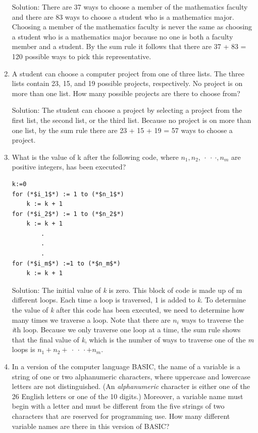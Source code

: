 \documentclass[11pt,a4paper]{book}
\begin{document}
\begin{enumerate}[label=Example~\arabic*]
Solution: There are 37 ways to choose a member of the mathematics faculty and there are 83 ways to choose a student who is a mathematics major.
Choosing a member of the mathematics faculty is never the same as choosing a student who is a mathematics major because no one is both a faculty member and a student.
By the sum rule it follows that there are 37 + 83 = 120 possible ways to pick this representative.

\item A student can choose a computer project from one of three lists.
The three lists contain 23, 15, and 19 possible projects, respectively.
No project is on more than one list. How many possible projects are there to choose from?

Solution: The student can choose a project by selecting a project from the first list, the second list, or the third list.
Because no project is on more than one list, by the sum rule there are 23 + 15 + 19 = 57 ways to choose a project.

\item What is the value of k after the following code, where $n_1, n_2, ~\cdot~\cdot~\cdot , n_m$ are positive integers, has been executed?

\begin{lstlisting}[style=CStyle]
k:=0
for (*$i_1$*) := 1 to (*$n_1$*)
	k := k + 1
for (*$i_2$*) := 1 to (*$n_2$*)
	k := k + 1
		.
		.
		.
for (*$i_m$*) :=1 to (*$n_m$*)
	k := k + 1
\end{lstlisting}

Solution: The initial value of \textit{k} is zero.
This block of code is made up of m different loops.
Each time a loop is traversed, 1 is added to \textit{k}.
To determine the value of \textit{k} after this code has been executed, we need to determine how many times we traverse a loop.
Note that there are $n_i$ ways to traverse the \textit{i}th loop.
Because we only traverse one loop at a time, the sum rule shows that the final value of \textit{k}, which is the number of ways to traverse one of the \textit{m} loops is $n_1 + n_2 +~\cdot~\cdot~\cdot+n_m$.

\item In a version of the computer language BASIC, the name of a variable is a string of one or two alphanumeric characters, where uppercase and lowercase letters are not distinguished.
(An \textit{alphanumeric} character is either one of the 26 English letters or one of the 10 digits.)
Moreover, a variable name must begin with a letter and must be different from the five strings of two characters that are reserved for programming use.
How many different variable names are there in this version of BASIC?


\end{enumerate}
\end{document}
